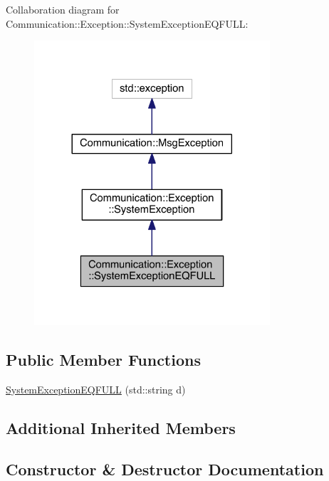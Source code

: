 Collaboration diagram for Communication\+:\+:Exception\+:\+:System\+Exception\+E\+Q\+F\+U\+L\+L\+:\nopagebreak
\begin{figure}[H]
\begin{center}
\leavevmode
\includegraphics[width=248pt]{class_communication_1_1_exception_1_1_system_exception_e_q_f_u_l_l__coll__graph}
\end{center}
\end{figure}
\subsection*{Public Member Functions}
\begin{DoxyCompactItemize}
\item 
\hyperlink{class_communication_1_1_exception_1_1_system_exception_e_q_f_u_l_l_a8da5b92497b9d1cb63878157345c9962}{System\+Exception\+E\+Q\+F\+U\+L\+L} (std\+::string d)
\end{DoxyCompactItemize}
\subsection*{Additional Inherited Members}


\subsection{Constructor \& Destructor Documentation}
\hypertarget{class_communication_1_1_exception_1_1_system_exception_e_q_f_u_l_l_a8da5b92497b9d1cb63878157345c9962}{}
